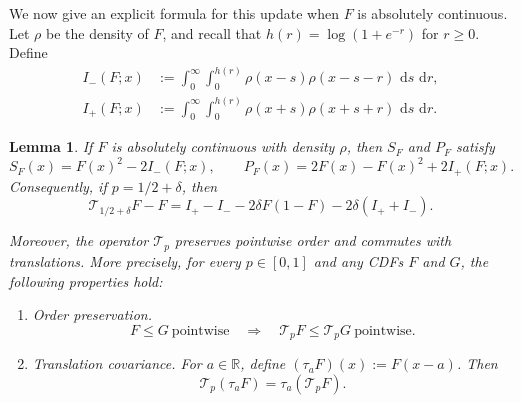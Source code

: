 \documentclass[12pt,preprint]{amsart}
\numberwithin{equation}{section}
\theoremstyle{plain}
\newtheorem{lemma}[theorem]{Lemma}
\theoremstyle{definition}
\newcommand{\dd}{\,\mathrm d}
\newcommand{\R}{\mathbb R}
\begin{document}
We now give an explicit formula for this update when $F$ is absolutely
continuous.  Let $\rho$ be the density of $F$, and recall that
$h(r)=\log(1+e^{-r})$ for $r\ge0$.
Define \[
\begin{aligned}
I_-(F;x)
 &:=\int_0^\infty\int_0^{h(r)}
   \rho(x-s)\rho(x-s-r)\,\dd s\,\dd r,
 \\
 I_+(F;x)
 &:=\int_0^\infty\int_0^{h(r)}
   \rho(x+s)\rho(x+s+r)\,\dd s\,\dd r.
\end{aligned} \]

\begin{lemma}
\label{lem:exact-cdf}
If $F$ is absolutely continuous with density $\rho$, then $S_F$ and $P_F$
satisfy
\begin{equation}
 S_F(x)=F(x)^2-2I_-(F;x),
 \qquad
 P_F(x)=2F(x)-F(x)^2+2I_+(F;x).
 \label{eq:series-parallel-cdf}
\end{equation}
Consequently, if $p=1/2+\delta$, then
\begin{equation}
 \mathcal T_{1/2+\delta}F-F
 =I_+-I_--2\delta F(1-F)-2\delta(I_++I_-).
 \label{eq:exact-cdf-operator}
\end{equation}
\begin{samepage}
Moreover, the operator $\mathcal T_p$ preserves pointwise order and commutes
with translations.  More precisely, for every $p\in[0,1]$ and any CDFs $F$
and $G$, the following properties hold:
\begin{enumerate}
\item[(i)] \emph{Order preservation.}
\[
 F\le G\ \text{pointwise}
 \quad\Longrightarrow\quad
 \mathcal T_pF\le\mathcal T_pG\ \text{pointwise}.
\]
\item[(ii)] \emph{Translation covariance.}  For $a\in\R$, define
$(\tau_aF)(x):=F(x-a)$.  Then
\[
 \mathcal T_p(\tau_aF)=\tau_a(\mathcal T_pF).
\]
\end{enumerate}
\end{samepage}
\end{lemma}
\end{document}
